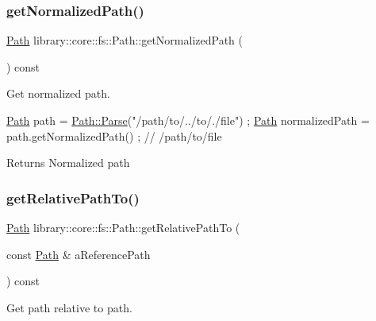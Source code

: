 \subsubsection{\texorpdfstring{get\+Normalized\+Path()}{getNormalizedPath()}}
{\footnotesize\ttfamily \hyperlink{classlibrary_1_1core_1_1fs_1_1_path}{Path} library\+::core\+::fs\+::\+Path\+::get\+Normalized\+Path (\begin{DoxyParamCaption}{ }\end{DoxyParamCaption}) const}



Get normalized path. 


\begin{DoxyCode}
\hyperlink{classlibrary_1_1core_1_1fs_1_1_path_aaba9a8e0153813f08f78f1c3275734a4}{Path} path = \hyperlink{classlibrary_1_1core_1_1fs_1_1_path_aebf5bd3af83e0b7376616e146f3e55df}{Path::Parse}(\textcolor{stringliteral}{"/path/to/../to/./file"}) ;
\hyperlink{classlibrary_1_1core_1_1fs_1_1_path_aaba9a8e0153813f08f78f1c3275734a4}{Path} normalizedPath = path.getNormalizedPath() ; \textcolor{comment}{// /path/to/file}
\end{DoxyCode}


\begin{DoxyReturn}{Returns}
Normalized path 
\end{DoxyReturn}
\mbox{\label{classlibrary_1_1core_1_1fs_1_1_path_a8f24340e887cfbfe675e96c0ba92321f}} 
\subsubsection{\texorpdfstring{get\+Relative\+Path\+To()}{getRelativePathTo()}}
{\footnotesize\ttfamily \hyperlink{classlibrary_1_1core_1_1fs_1_1_path}{Path} library\+::core\+::fs\+::\+Path\+::get\+Relative\+Path\+To (\begin{DoxyParamCaption}\item[{const \hyperlink{classlibrary_1_1core_1_1fs_1_1_path}{Path} \&}]{a\+Reference\+Path }\end{DoxyParamCaption}) const}



Get path relative to path. 



